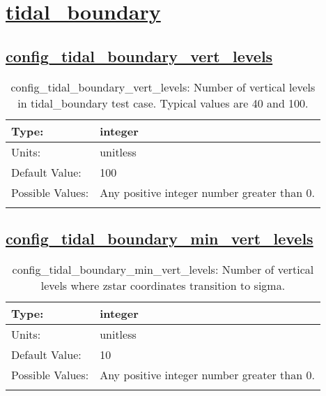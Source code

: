 \section[tidal\_boundary]{\hyperref[sec:nm_tab_tidal_boundary]{tidal\_boundary}}
\label{sec:nm_sec_tidal_boundary}
\subsection[config\_tidal\_boundary\_vert\_levels]{\hyperref[sec:nm_tab_tidal_boundary]{config\_tidal\_boundary\_vert\_levels}}
\label{subsec:nm_sec_config_tidal_boundary_vert_levels}
\begin{center}
\begin{longtable}{| p{2.0in} || p{4.0in} |}
    \hline
    Type: & integer \\
    \hline
    Units: & \si{unitless} \\
    \hline
    Default Value: & 100 \\
    \hline
    Possible Values: & Any positive integer number greater than 0. \\
    \hline
    \caption{config\_tidal\_boundary\_vert\_levels: Number of vertical levels in tidal\_boundary test case. Typical values are 40 and 100.}
\end{longtable}
\end{center}
\subsection[config\_tidal\_boundary\_min\_vert\_levels]{\hyperref[sec:nm_tab_tidal_boundary]{config\_tidal\_boundary\_min\_vert\_levels}}
\label{subsec:nm_sec_config_tidal_boundary_min_vert_levels}
\begin{center}
\begin{longtable}{| p{2.0in} || p{4.0in} |}
    \hline
    Type: & integer \\
    \hline
    Units: & \si{unitless} \\
    \hline
    Default Value: & 10 \\
    \hline
    Possible Values: & Any positive integer number greater than 0. \\
    \hline
    \caption{config\_tidal\_boundary\_min\_vert\_levels: Number of vertical levels where zstar coordinates transition to sigma.}
\end{longtable}
\end{center}
